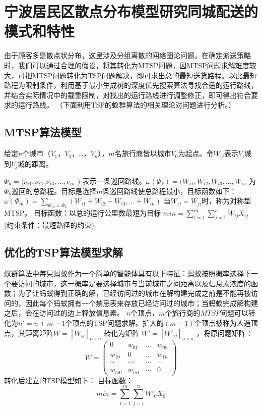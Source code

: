 \clearpage
\setcounter{equation}{0}
\section{宁波居民区散点分布模型研究同城配送的模式和特性}
由于顾客多是散点状分布，这里涉及分组离散的网络图论问题。在确定派送策略时，我们可以通过合理的假设，将其转化为MTSP问题，因MTSP问题求解难度较大，可把MTSP问题转化为TSP问题解决，即可求出总的最短送货路程。以此最短路程为限制条件，利用基于最小生成树的深度优先搜索算法寻找合适的运行路线，并结合实际情况中的载重限制，对找出的运行路线进行调整修正，即可得出符合要求的运行路线。 
（下面利用TSP的蚁群算法的相关理论对问题进行分析。）

\subsection{MTSP算法模型}
给定$n$个城市（$V_1$，$V_2$，…，$V_n$），$m$名旅行商皆以城市$V_0$为起点。令$W_{ij}$表示$V_i$城到$V_j$城的距离。

 $\Phi_{k}=(\nu_{i1},\nu_{i2},\nu_{i3},...,\nu_{in}$ ) 表示一条巡回路线。$\omega  (\Phi_{k})=(W_{i1},W_{i2},W_{i3},...,W_{in}$ 为$\Phi_{k}$巡回的总路程。目标是选择$m$条巡回路线使总路程最小，目标函数如下： 
 $\omega (\Phi _{m} )=\sum_{\Phi _{m}=\Phi _{k}}^{}(W_{i1}+W_{i2}+W_{i3},...+W_{in} )$
当$W_{ij}=W_{ji}$时，称为对称型MTSP。 
目标函数：以总的运行公里数最短为目标 
$min=\sum_{i=1}^{m} \sum_{j=1}^{n}W_{ij}X_{ij} $
(约束条件：最短路径的约束)

\subsection{优化的TSP算法模型求解}
\par 蚁群算法中每只蚂蚁作为一个简单的智能体具有以下特征：蚂蚁按照概率选择下一个要访问的城市，这一概率是要选择城市与当前城市之间距离以及信息素浓度的函数；为了让蚂蚁得到正确的解，已经访问过的城市在解构建完成之前是不能再被访问的，因此每个蚂蚁拥有一个禁忌表来存放已经访问过的城市；当蚂蚁完成解构建之后，会在访问过的边上释放信息素。
$n$个顶点，$m$个旅行商的$MTSP$问题可以转化为$n'=n+m-1$个顶点的TSP问题求解。扩大的$(m-1)$个顶点被称为人造顶点，其距离矩阵$W=\left [ W_{ij}  \right ]_{n\times n}$ 
转化为矩阵
$W'=\left [ W'_{ij}  \right ]_{n\times n}$
，将原问题矩阵：
\begin{equation} 
 W=\left(\begin{array} {cccc}
 0 & w_{01} & \ldots & w_{0 n} \\
 w_{10} & 0 & \ldots & w_{1 n} \\
 \cdots  & \cdots & \cdots  & \cdots  \\
 w_{m 0} & w_{m 1} & \cdots  & 0
 \end{array}
 \right)
 \end{equation} 
转化后建立的TSP模型如下：
目标函数：
\begin{equation} 
 min=\sum_{i=1}^{m}\sum_{j=1}^{n}W'_{0}X_{0}    
 \end{equation}

